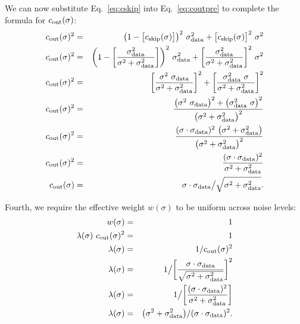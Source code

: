 We can now substitute Eq.~\ref{eq:cskip} into Eq.~\ref{eq:coutpre} to complete the formula for $c_\text{out}(\sigma)$:
\begin{eqnarray}
  c_\text{out}(\sigma)^2 &=& \big( 1 - \big[ c_\text{skip}(\sigma) \big] \big)^2 ~\sigma_\text{data}^2 + \big[ c_\text{skip}(\sigma) \big]^2 ~\sigma^2 \\
  c_\text{out}(\sigma)^2 &=& \bigg( 1 - \bigg[ \frac{\sigma_\text{data}^2}{\sigma^2 + \sigma_\text{data}^2} \bigg] \bigg)^2 ~\sigma_\text{data}^2 + \bigg[ \frac{\sigma_\text{data}^2}{\sigma^2 + \sigma_\text{data}^2} \bigg]^2 ~\sigma^2 \\
  c_\text{out}(\sigma)^2 &=& \bigg[ \frac{\sigma^2 ~\sigma_\text{data}}{\sigma^2 + \sigma_\text{data}^2} \bigg]^2 + \bigg[ \frac{\sigma_\text{data}^2 ~\sigma}{\sigma^2 + \sigma_\text{data}^2} \bigg]^2 \\
  c_\text{out}(\sigma)^2 &=& \frac{\big( \sigma^2 ~\sigma_\text{data} \big)^2 + \big( \sigma_\text{data}^2 ~\sigma \big)^2}{\big( \sigma^2 + \sigma_\text{data}^2 \big)^2} \\
  c_\text{out}(\sigma)^2 &=& \frac{(\sigma \cdot \sigma_\text{data})^2 ~\big( \sigma^2 + \sigma_\text{data}^2 \big)}{\big( \sigma^2 + \sigma_\text{data}^2 \big)^2} \\
  c_\text{out}(\sigma)^2 &=& \frac{(\sigma \cdot \sigma_\text{data})^2}{\sigma^2 + \sigma_\text{data}^2} \\
  c_\text{out}(\sigma) &=& \sigma \cdot \sigma_\text{data} \big/ \sqrt{\sigma^2 + \sigma_\text{data}^2}
  \text{.}
\end{eqnarray}

Fourth, we require the effective weight $w(\sigma)$ to be uniform across noise levels:
\begin{eqnarray}
  w(\sigma) &=& 1 \\
  \lambda(\sigma) ~c_\text{out}(\sigma)^2 &=& 1 \\
  \lambda(\sigma) &=& 1 / c_\text{out}(\sigma)^2 \\
  \lambda(\sigma) &=& 1 \big/ \bigg[ \frac{\sigma \cdot \sigma_\text{data}}{\sqrt{\sigma^2 + \sigma_\text{data}^2}} \bigg]^2 \\
  \lambda(\sigma) &=& 1 \big/ \bigg[ \frac{(\sigma \cdot \sigma_\text{data})^2}{\sigma^2 + \sigma_\text{data}^2} \bigg] \\
  \lambda(\sigma) &=& \big( \sigma^2 + \sigma_\text{data}^2 \big) / (\sigma \cdot \sigma_\text{data})^2
  \text{.}
\end{eqnarray}

